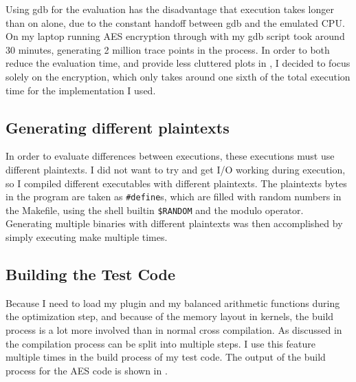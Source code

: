 Using gdb for the evaluation has the disadvantage that execution takes longer than on \qemu{} alone, due to the constant handoff between gdb and the emulated CPU.
On my laptop running AES encryption through \qemu{} with my gdb script took around 30 minutes, generating 2 million trace points in the process.
In order to both reduce the evaluation time, and provide less cluttered plots in , I decided to focus solely on the encryption, which only takes around one sixth of the total execution time for the implementation I used.

\subsection{Generating different plaintexts}
In order to evaluate \hammingw{} differences between executions, these executions must use different plaintexts.
I did not want to try and get I/O working during execution, so I compiled different executables with different plaintexts.
The plaintexts bytes in the program are taken as \texttt{\#define}s, which are filled with random numbers in the Makefile, using the shell builtin \texttt{\$RANDOM} and the modulo operator.
Generating multiple binaries with different plaintexts was then accomplished by simply executing make multiple times.

\subsection{Building the Test Code}
\label{buildtest}
Because I need to load my plugin and my balanced arithmetic functions during the optimization step, and because of the memory layout in \qemu{} kernels, the build process is a lot more involved than in normal cross compilation.
As discussed in  the \llvm{} compilation process can be split into multiple steps.
I use this feature multiple times in the build process of my test code.
The output of the build process for the AES code is shown in .

